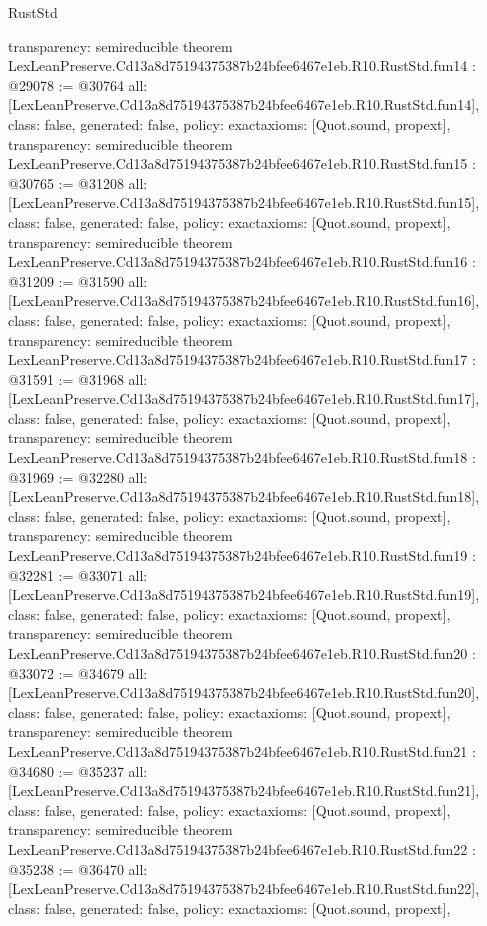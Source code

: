 \begin{lexlean}{RustStd}
\begin{coremodule}
{  transparency: semireducible
}
theorem LexLeanPreserve.Cd13a8d75194375387b24bfee6467e1eb.R10.RustStd.fun14 : @29078 := @30764 {
  all: [LexLeanPreserve.Cd13a8d75194375387b24bfee6467e1eb.R10.RustStd.fun14],
  class: false,
  generated: false,
  policy: exact{axioms: [Quot.sound, propext]},
  transparency: semireducible
}
theorem LexLeanPreserve.Cd13a8d75194375387b24bfee6467e1eb.R10.RustStd.fun15 : @30765 := @31208 {
  all: [LexLeanPreserve.Cd13a8d75194375387b24bfee6467e1eb.R10.RustStd.fun15],
  class: false,
  generated: false,
  policy: exact{axioms: [Quot.sound, propext]},
  transparency: semireducible
}
theorem LexLeanPreserve.Cd13a8d75194375387b24bfee6467e1eb.R10.RustStd.fun16 : @31209 := @31590 {
  all: [LexLeanPreserve.Cd13a8d75194375387b24bfee6467e1eb.R10.RustStd.fun16],
  class: false,
  generated: false,
  policy: exact{axioms: [Quot.sound, propext]},
  transparency: semireducible
}
theorem LexLeanPreserve.Cd13a8d75194375387b24bfee6467e1eb.R10.RustStd.fun17 : @31591 := @31968 {
  all: [LexLeanPreserve.Cd13a8d75194375387b24bfee6467e1eb.R10.RustStd.fun17],
  class: false,
  generated: false,
  policy: exact{axioms: [Quot.sound, propext]},
  transparency: semireducible
}
theorem LexLeanPreserve.Cd13a8d75194375387b24bfee6467e1eb.R10.RustStd.fun18 : @31969 := @32280 {
  all: [LexLeanPreserve.Cd13a8d75194375387b24bfee6467e1eb.R10.RustStd.fun18],
  class: false,
  generated: false,
  policy: exact{axioms: [Quot.sound, propext]},
  transparency: semireducible
}
theorem LexLeanPreserve.Cd13a8d75194375387b24bfee6467e1eb.R10.RustStd.fun19 : @32281 := @33071 {
  all: [LexLeanPreserve.Cd13a8d75194375387b24bfee6467e1eb.R10.RustStd.fun19],
  class: false,
  generated: false,
  policy: exact{axioms: [Quot.sound, propext]},
  transparency: semireducible
}
theorem LexLeanPreserve.Cd13a8d75194375387b24bfee6467e1eb.R10.RustStd.fun20 : @33072 := @34679 {
  all: [LexLeanPreserve.Cd13a8d75194375387b24bfee6467e1eb.R10.RustStd.fun20],
  class: false,
  generated: false,
  policy: exact{axioms: [Quot.sound, propext]},
  transparency: semireducible
}
theorem LexLeanPreserve.Cd13a8d75194375387b24bfee6467e1eb.R10.RustStd.fun21 : @34680 := @35237 {
  all: [LexLeanPreserve.Cd13a8d75194375387b24bfee6467e1eb.R10.RustStd.fun21],
  class: false,
  generated: false,
  policy: exact{axioms: [Quot.sound, propext]},
  transparency: semireducible
}
theorem LexLeanPreserve.Cd13a8d75194375387b24bfee6467e1eb.R10.RustStd.fun22 : @35238 := @36470 {
  all: [LexLeanPreserve.Cd13a8d75194375387b24bfee6467e1eb.R10.RustStd.fun22],
  class: false,
  generated: false,
  policy: exact{axioms: [Quot.sound, propext]},
}
\end{coremodule}
\end{lexlean}
